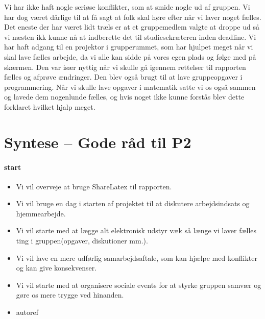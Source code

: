 \documentclass[oneside,a4paper,titlepage]{article}
\begin{document}
Vi har ikke haft nogle seriøse konflikter, som at smide nogle ud af gruppen. Vi har dog været dårlige til at få sagt at folk skal høre efter når vi laver noget fælles. Det eneste der har været lidt træls er at et gruppemedlem valgte at droppe ud så vi næsten ikk kunne nå at indberette det til studiesekræteren inden deadline. \newline\newline
Vi har haft adgang til en projektor i grupperummet, som har hjulpet meget når vi skal lave fælles arbejde, da vi alle kan sidde på vores egen plads og følge med på skærmen. Den var især nyttig når vi skulle gå igennem rettelser til rapporten fælles og afprøve ændringer. Den blev også brugt til at lave gruppeopgaver i programmering. Når vi skulle lave opgaver i matematik satte vi os også sammen og lavede dem nogenlunde fælles, og hvis noget ikke kunne forstås blev dette forklaret hvilket hjalp meget. 


\section{Syntese – Gode råd til P2}

\paragraph{start}
\begin{itemize}
  \item Vi vil overveje at bruge ShareLatex til rapporten. 
  \item Vi vil bruge en dag i starten af projektet til at diskutere arbejdsindsats og hjemmearbejde. 
  \item Vi vil starte med at lægge alt elektronisk udstyr væk så længe vi laver fælles ting i gruppen(opgaver, diskutioner mm.).
  \item Vi vil lave en mere udførlig samarbejdsaftale, som kan hjælpe med konflikter og kan give konsekvenser. 
  \item Vi vil starte med at organisere sociale events for at styrke gruppen samvær og gøre os mere trygge ved hinanden.
  \item autoref
\end{itemize}
\end{document}
